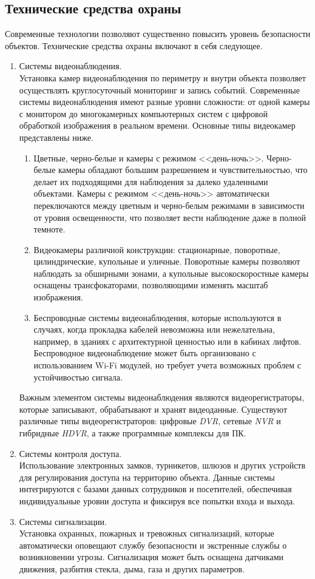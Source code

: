\subsection{Технические средства охраны}
Современные технологии позволяют существенно повысить уровень безопасности объектов. Технические средства охраны включают в себя следующее.
\begin{enumerate}
    \item Системы видеонаблюдения. \\
Установка камер видеонаблюдения по периметру и внутри объекта позволяет осуществлять круглосуточный мониторинг и запись событий. Современные системы видеонаблюдения имеют разные уровни сложности: от одной камеры с монитором до многокамерных компьютерных систем с цифровой обработкой изображения в реальном времени. Основные типы видеокамер представлены ниже.
\begin{enumerate}
\item Цветные, черно-белые и камеры с режимом <<день-ночь>>. Черно-белые камеры обладают большим разрешением и чувствительностью, что делает их подходящими для наблюдения за далеко удаленными объектами. Камеры с режимом <<день-ночь>> автоматически переключаются между цветным и черно-белым режимами в зависимости от уровня освещенности, что позволяет вести наблюдение даже в полной темноте.
\item Видеокамеры различной конструкции: стационарные, поворотные, цилиндрические, купольные и уличные. Поворотные камеры позволяют наблюдать за обширными зонами, а купольные высокоскоростные камеры оснащены трансфокаторами, позволяющими изменять масштаб изображения.
\item Беспроводные системы видеонаблюдения, которые используются в случаях, когда прокладка кабелей невозможна или нежелательна, например, в зданиях с архитектурной ценностью или в кабинах лифтов. Беспроводное видеонаблюдение может быть организовано с использованием Wi-Fi модулей, но требует учета возможных проблем с устойчивостью сигнала.
\end{enumerate}
Важным элементом системы видеонаблюдения являются видеорегистраторы, которые записывают, обрабатывают и хранят видеоданные. Существуют различные типы видеорегистраторов: цифровые \textit{DVR}, сетевые \textit{NVR} и гибридные \textit{HDVR}, а также программные комплексы для ПК.
    \item Системы контроля доступа. \\
    Использование электронных замков, турникетов, шлюзов и других устройств для регулирования доступа на территорию объекта. Данные системы интегрируются с базами данных сотрудников и посетителей, обеспечивая индивидуальные уровни доступа и фиксируя все попытки входа и выхода.
    \item Системы сигнализации. \\
    Установка охранных, пожарных и тревожных сигнализаций, которые автоматически оповещают службу безопасности и экстренные службы о возникновении угрозы. Сигнализация может быть оснащена датчиками движения, разбития стекла, дыма, газа и других параметров.
\end{enumerate}

